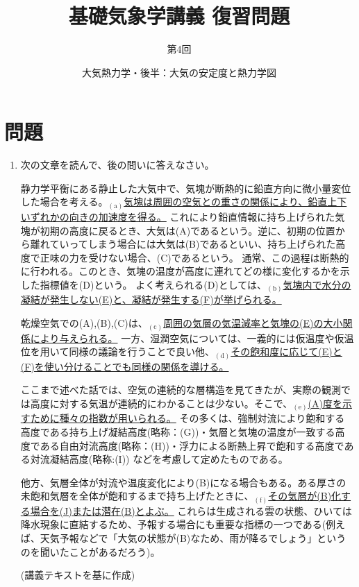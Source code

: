 \documentclass{jsarticle}
\newenvironment{problems}
{
  \renewcommand\labelenumi{\doublebox{\arabic{enumi}}}
  \begin{enumerate}
}{
  \end{enumerate}
  \renewcommand\labelenumi{\arabic{enumi}.}
}
\begin{document}
\title{基礎気象学講義 復習問題} %
\author{第4回} %
\date{大気熱力学・後半：大気の安定度と熱力学図} %
\maketitle

\section{問題}

    \begin{problems}
    \item 次の文章を読んで、後の問いに答えなさい。%
        \begin{screen}
          静力学平衡にある静止した大気中で、気塊が断熱的に鉛直方向に微小量変位した場合を考える。$_{(\mathrm{a})}$\underline{気塊は周囲の空気との重さの関係により、鉛直上下いずれかの向きの加速度を得る。}
          これにより鉛直情報に持ち上げられた気塊が初期の高度に戻るとき、大気は(A)であるという。逆に、初期の位置から離れていってしまう場合には大気は(B)であるといい、持ち上げられた高度で正味の力を受けない場合、(C)であるという。
          通常、この過程は断熱的に行われる。このとき、気塊の温度が高度に連れてどの様に変化するかを示した指標値を(D)という。
          よく考えられる(D)としては、$_{(\mathrm{b})}$\underline{気塊内で水分の凝結が発生しない(E)と、凝結が発生する(F)が挙げられる。}

          乾燥空気での(A),(B),(C)は、$_{(\mathrm{c})}$\underline{周囲の気層の気温減率と気塊の(E)の大小関係により与えられる。}
          一方、湿潤空気については、一義的には仮温度や仮温位を用いて同様の議論を行うことで良い他、$_{(\mathrm{d})}$\underline{その飽和度に応じて(E)と(F)を使い分けることでも同様の関係を導ける。}
          
          ここまで述べた話では、空気の連続的な層構造を見てきたが、実際の観測では高度に対する気温が連続的にわかることは少ない。そこで、$_{(\mathrm{e})}$\underline{(A)度を示すために種々の指数が用いられる。}
          その多くは、強制対流により飽和する高度である持ち上げ凝結高度(略称：(G))・気層と気塊の温度が一致する高度である自由対流高度(略称：(H))・浮力による断熱上昇で飽和する高度である対流凝結高度(略称:(I))
          などを考慮して定めたものである。

          他方、気層全体が対流や温度変化により(B)になる場合もある。ある厚さの未飽和気層を全体が飽和するまで持ち上げたときに、$_{(\mathrm{f})}$\underline{その気層が(B)化する場合を(J)または潜在(B)とよぶ。}
          これらは生成される雲の状態、ひいては降水現象に直結するため、予報する場合にも重要な指標の一つである(例えば、天気予報などで「大気の状態が(B)なため、雨が降るでしょう」というのを聞いたことがあるだろう)。
            \begin{flushright}
            (講義テキストを基に作成)
            \end{flushright}
        \end{screen}


\end{problems}
\end{document}
